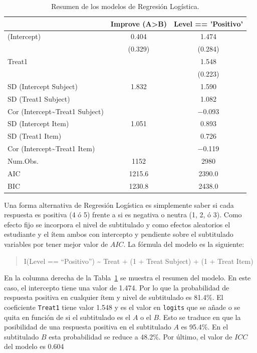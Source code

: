 \documentclass[
  12pt,
  a4paper,
  extrafontsizes,
  onecolumn,
  openright,
  table]{memoir}
\begin{document}
\hypertarget{tbl-selected-logistic}{}
\begin{table}
\caption{\label{tbl-selected-logistic}Resumen de los modelos de Regresión Logística. }\tabularnewline

\centering
\begin{tabular}[t]{lcc}
\toprule
  & Improve (A>B) & Level == 'Positivo'\\
\midrule
(Intercept) & \num{0.404} & \num{1.474}\\
 & (\num{0.329}) & (\num{0.284})\\
Treat1 &  & \num{1.548}\\
 &  & (\num{0.223})\\
SD (Intercept Subject) & \num{1.832} & \num{1.590}\\
SD (Treat1 Subject) &  & \num{1.082}\\
Cor (Intercept\textasciitilde{}Treat1 Subject) &  & \num{-0.093}\\
SD (Intercept Item) & \num{1.051} & \num{0.893}\\
SD (Treat1 Item) &  & \num{0.726}\\
Cor (Intercept\textasciitilde{}Treat1 Item) &  & \num{-0.119}\\
\midrule
Num.Obs. & \num{1152} & \num{2980}\\
AIC & \num{1215.6} & \num{2390.0}\\
BIC & \num{1230.8} & \num{2438.0}\\
\bottomrule
\end{tabular}
\end{table}

Una forma alternativa de Regresión Logística es simplemente saber si
cada respuesta es positiva (4 ó 5) frente a si es negativa o neutra (1,
2, ó 3). Como efecto fijo se incorpora el nivel de subtitulado y como
efectos aleatorios el estudiante y el ítem ambos con intercepto y
pendiente sobre el subtitulado variables por tener mejor valor de
\(AIC\). La fórmula del modelo es la siguiente:

\small

\begin{quote}
I(Level == \enquote{Positivo}) \textasciitilde{} Treat + (1 + Treat
\textbar{} Subject) + (1 + Treat \textbar{} Item)
\end{quote}

\normalsize

En la columna derecha de la Tabla~\ref{tbl-selected-logistic} se muestra
el resumen del modelo. En este caso, el intercepto tiene una valor de
1.474. Por lo que la probabilidad de respuesta positiva en cualquier
ítem y nivel de subtitulado es 81.4\%. El coeficiente \texttt{Treat1}
tiene valor 1.548 y es el valor en \texttt{logits} que se añade o se
quita en función de si el subtitulado es el \(A\) o el \(B\). Esto se
traduce en que la posibilidad de una respuesta positiva en el
subtitulado \(A\) es 95.4\%. En el subtitulado \(B\) esta probabilidad
se reduce a 48.2\%. Por último, el valor de \(ICC\) del modelo es 0.604
\end{document}
